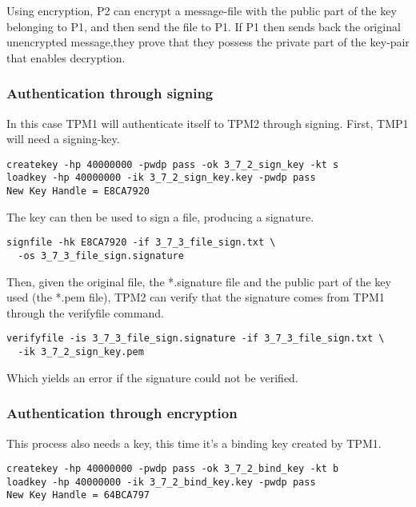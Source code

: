 \documentclass[10pt]{article}
\begin{document}
    Using encryption, P2 can encrypt a message-file with the public part of the
    key belonging to P1, and then send the file to P1. If P1 then sends back
    the original unencrypted message,they prove that they possess the private
    part of the key-pair that enables decryption.

    \subsubsection{Authentication through signing}

      In this case TPM1 will authenticate itself to TPM2 through signing.
      First, TMP1 will need a signing-key.

\begin{verbatim}
createkey -hp 40000000 -pwdp pass -ok 3_7_2_sign_key -kt s
loadkey -hp 40000000 -ik 3_7_2_sign_key.key -pwdp pass
New Key Handle = E8CA7920
\end{verbatim}

      The key can then be used to sign a file, producing a signature.

\begin{verbatim}
signfile -hk E8CA7920 -if 3_7_3_file_sign.txt \
  -os 3_7_3_file_sign.signature
\end{verbatim}

      Then, given the original file, the *.signature file and the public part of
      the key used (the *.pem file), TPM2 can verify that the signature comes from
      TPM1 through the verifyfile command.

\begin{verbatim}
verifyfile -is 3_7_3_file_sign.signature -if 3_7_3_file_sign.txt \
  -ik 3_7_2_sign_key.pem
\end{verbatim}

      Which yields an error if the signature could not be verified.

    \subsubsection{Authentication through encryption}

      This process also needs a key, this time it's a binding key created by
      TPM1.

\begin{verbatim}
createkey -hp 40000000 -pwdp pass -ok 3_7_2_bind_key -kt b
loadkey -hp 40000000 -ik 3_7_2_bind_key.key -pwdp pass
New Key Handle = 64BCA797
\end{verbatim}
\end{document}
